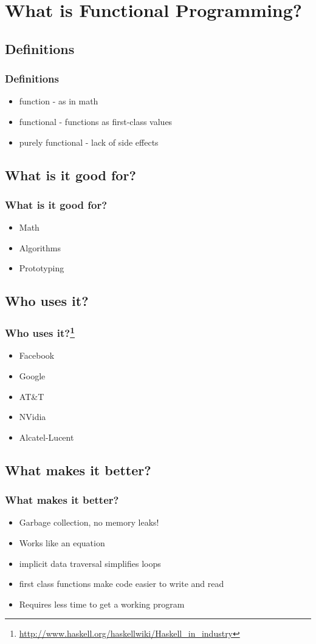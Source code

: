 \documentclass[xcolor=pdftex,dvipsnames,table]{beamer}
\begin{document}
\section{What is Functional Programming?}
\subsection{Definitions}
\begin{frame}
  \frametitle{Definitions}
  \begin{itemize}
  \item function - as in math
  \item functional - functions as first-class values
  \item purely functional - lack of side effects
  \end{itemize}
\end{frame}
\subsection{What is it good for?}
\begin{frame}
  \frametitle{What is it good for?}
  \begin{itemize}
  \item Math
  \item Algorithms
  \item Prototyping
  \end{itemize}
\end{frame}

\subsection{Who uses it?}
\begin{frame}
  \frametitle{Who uses it?\footnote{\url{http://www.haskell.org/haskellwiki/Haskell_in_industry}}}
  \begin{itemize}
  \item Facebook
  \item Google
  \item AT\&T
  \item NVidia
  \item Alcatel-Lucent
  \end{itemize}
\end{frame}

\subsection{What makes it better?}
\begin{frame}
  \frametitle{What makes it better?}
  \begin{itemize}
  \item Garbage collection, no memory leaks!
  \item Works like an equation
  \item implicit data traversal simplifies loops
  \item first class functions make code easier to write and read
  \item Requires less time to get a working program
  \end{itemize}
\end{frame}
\end{document}
